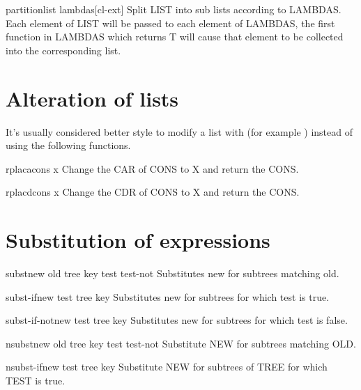 \documentclass[10pt,english]{book}
\begin{document}
\begin{function}{partition}{list \rest lambdas}[cl-ext]
  Split LIST into sub lists according to LAMBDAS. Each element of LIST
  will be passed to each element of LAMBDAS, the first function in
  LAMBDAS which returns T will cause that element to be collected into
  the corresponding list.
\end{function}

\section{Alteration of lists}
\label{sec:alteration-lists}

It's usually considered better style to modify a list with
 (for example ) instead of
using the following functions.

\begin{function}{rplaca}{cons x}
  Change the CAR of CONS to X and return the CONS.
\end{function}

\begin{function}{rplacd}{cons x}
  Change the CDR of CONS to X and return the CONS.
\end{function}

\section{Substitution of expressions}
\label{sec:subst-expr}

\begin{function}{subst}{new old tree \key key test test-not}
  Substitutes new for subtrees matching old.
\end{function}

\begin{function}{subst-if}{new test tree \key key}
  Substitutes new for subtrees for which test is true.
\end{function}

\begin{function}{subst-if-not}{new test tree \key key}
  Substitutes new for subtrees for which test is false.
\end{function}

\begin{function}{nsubst}{new old tree \key key test test-not}
  Substitute NEW for subtrees matching OLD.
\end{function}

\begin{function}{nsubst-if}{new test tree \key key}
  Substitute NEW for subtrees of TREE for which TEST is true.
\end{function}
\end{document}
